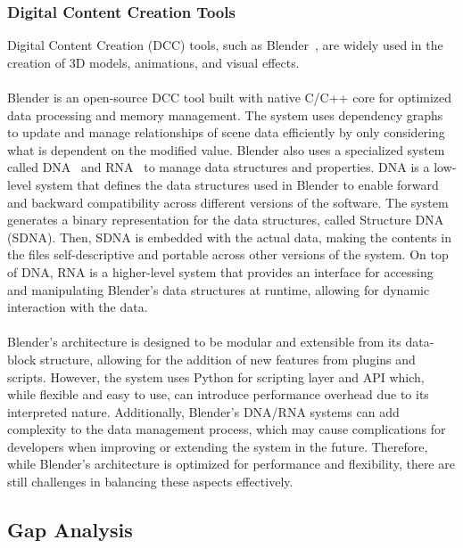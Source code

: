 \subsubsection*{Digital Content Creation Tools}

Digital Content Creation (DCC) tools, such as Blender~\cite{Blender}, are widely used in the creation 
of 3D models, animations, and visual effects.
\\\\
Blender is an open-source DCC tool built with native C/C++ core for optimized data processing and 
memory management.
The system uses dependency graphs~\cite{Blender_Dependency} to update and manage relationships of scene data
efficiently by only considering what is dependent on the modified value.
Blender also uses a specialized system called DNA~\cite{Blender_DNA} and RNA~\cite{Blender_RNA} to manage 
data structures and properties.
DNA is a low-level system that defines the data structures used in Blender to enable forward and backward 
compatibility across different versions of the software.
The system generates a binary representation for the data structures, called Structure DNA (SDNA).
Then, SDNA is embedded with the actual data, making the contents in the files self-descriptive and portable 
across other versions of the system.
On top of DNA, RNA is a higher-level system that provides an interface for accessing and manipulating 
Blender's data structures at runtime, allowing for dynamic interaction with the data.
\\\\
Blender's architecture is designed to be modular and extensible from its data-block structure, allowing for
the addition of new features from plugins and scripts.
However, the system uses Python for scripting layer and API which, while flexible and easy to use,
can introduce performance overhead due to its interpreted nature.
Additionally, Blender's DNA/RNA systems can add complexity to the data management process, which may cause 
complications for developers when improving or extending the system in the future.
Therefore, while Blender's architecture is optimized for performance and flexibility, there are still 
challenges in balancing these aspects effectively.

\subsection{Gap Analysis}
\label{subsec:gap-analysis}


